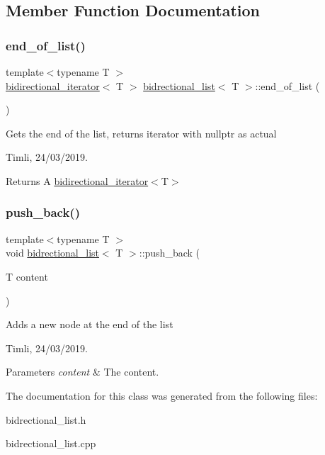 \subsection{Member Function Documentation}
\mbox{\label{classbidrectional__list_a2e5bed9d79901f40af72f09b8ba30e69}} 
\subsubsection{\texorpdfstring{end\_of\_list()}{end\_of\_list()}}
{\footnotesize\ttfamily template$<$typename T $>$ \\
\mbox{\hyperlink{classbidirectional__iterator}{bidirectional\+\_\+iterator}}$<$ T $>$ \mbox{\hyperlink{classbidrectional__list}{bidrectional\+\_\+list}}$<$ T $>$\+::end\+\_\+of\+\_\+list (\begin{DoxyParamCaption}{ }\end{DoxyParamCaption})}



Gets the end of the list, returns iterator with nullptr as actual 

Timli, 24/03/2019.

\begin{DoxyReturn}{Returns}
A \mbox{\hyperlink{classbidirectional__iterator}{bidirectional\+\_\+iterator}}$<$T$>$
\end{DoxyReturn}
\mbox{\label{classbidrectional__list_a3d403e16b536de9420bf09061b9b374a}} 
\subsubsection{\texorpdfstring{push\_back()}{push\_back()}}
{\footnotesize\ttfamily template$<$typename T $>$ \\
void \mbox{\hyperlink{classbidrectional__list}{bidrectional\+\_\+list}}$<$ T $>$\+::push\+\_\+back (\begin{DoxyParamCaption}\item[{T}]{content }\end{DoxyParamCaption})}



Adds a new node at the end of the list 

Timli, 24/03/2019.


\begin{DoxyParams}{Parameters}
{\em content} & The content.\\
\hline
\end{DoxyParams}


The documentation for this class was generated from the following files\+:\begin{DoxyCompactItemize}
\item 
bidrectional\+\_\+list.\+h\item 
bidrectional\+\_\+list.\+cpp\end{DoxyCompactItemize}
